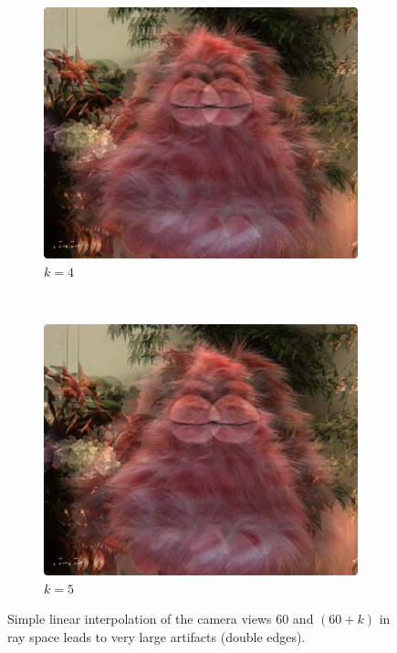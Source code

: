 \documentclass[a4paper]{article}
\begin{document}
\begin{figure}[ht]
	\vspace{2mm}
	\begin{subfigure}[h]{0.48\textwidth}
	  \centering
	  \includegraphics[width=\textwidth]{LinearInterpolation60_64}
	  \caption*{$k=4$}
	\end{subfigure}
	~
	\begin{subfigure}[h]{0.48\textwidth}
	  \centering
	  \includegraphics[width=\textwidth]{LinearInterpolation60_65}
	  \caption*{$k=5$}
	\end{subfigure}
\caption{Simple linear interpolation of the camera views $60$ and $(60 + k)$ in ray space leads to very large artifacts (double edges).}
\label{fig:linearInterpolation}
\end{figure}
\end{document}
